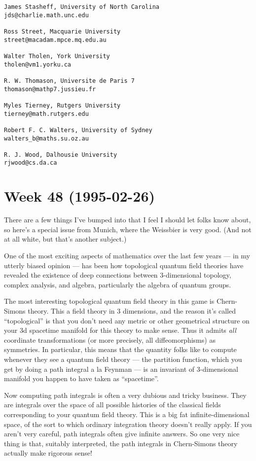 \documentclass{article}
\begin{document}
\begin{verbatim}
James Stasheff, University of North Carolina
jds@charlie.math.unc.edu
 
Ross Street, Macquarie University 
street@macadam.mpce.mq.edu.au
 
Walter Tholen, York University
tholen@vm1.yorku.ca
 
R. W. Thomason, Universite de Paris 7
thomason@mathp7.jussieu.fr
 
Myles Tierney, Rutgers University
tierney@math.rutgers.edu
 
Robert F. C. Walters, University of Sydney
walters_b@maths.su.oz.au
 
R. J. Wood, Dalhousie University
rjwood@cs.da.ca
\end{verbatim}
\hypertarget{week-48-1995-02-26}{%
\section{Week 48 (1995-02-26)}\label{week-48-1995-02-26}}

There are a few things I've bumped into that I feel I should let folks
know about, so here's a special issue from Munich, where the Weissbier
is very good. (And not at all white, but that's another subject.)

One of the most exciting aspects of mathematics over the last few years
--- in my utterly biased opinion --- has been how topological quantum
field theories have revealed the existence of deep connections between
3-dimensional topology, complex analysis, and algebra, particularly the
algebra of quantum groups.

The most interesting topological quantum field theory in this game is
Chern-Simons theory. This a field theory in 3 dimensions, and the reason
it's called ``topological'' is that you don't need any metric or other
geometrical structure on your 3d spacetime manifold for this theory to
make sense. Thus it admits \emph{all} coordinate transformations (or
more precisely, all diffeomorphisms) as symmetries. In particular, this
means that the quantity folks like to compute whenever they see a
quantum field theory --- the partition function, which you get by doing
a path integral a la Feynman --- is an invariant of 3-dimensional
manifold you happen to have taken as ``spacetime''.

Now computing path integrals is often a very dubious and tricky
business. They are integrals over the space of all possible histories of
the classical fields corresponding to your quantum field theory. This is
a big fat infinite-dimensional space, of the sort to which ordinary
integration theory doesn't really apply. If you aren't very careful,
path integrals often give infinite answers. So one very nice thing is
that, suitably interpreted, the path integrals in Chern-Simons theory
actually make rigorous sense!
\end{document}
